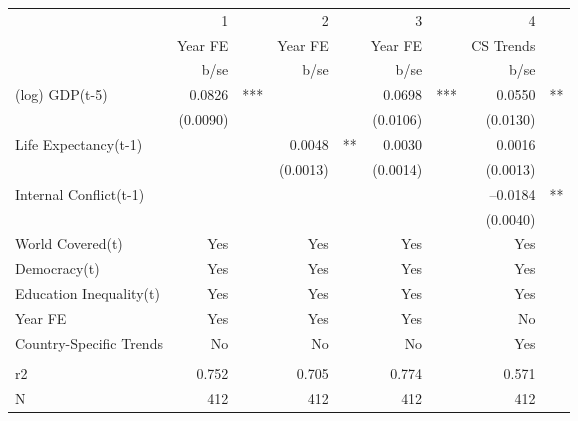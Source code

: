 \begin{tabular} {l* {4}{r @{} l}}
\hline
            &           1&   &           2&   &           3&   &           4&   \\
            &     Year FE&   &     Year FE&   &     Year FE&   &   CS Trends&   \\
            &        b/se&   &        b/se&   &        b/se&   &        b/se&   \\
\hline
(log) GDP(t-5) &      0.0826&***&            &   &      0.0698&***&      0.0550&** \\
            &    (0.0090)&   &            &   &    (0.0106)&   &    (0.0130)&   \\
Life Expectancy(t-1) &            &   &      0.0048&** &      0.0030&   &      0.0016&   \\
            &            &   &    (0.0013)&   &    (0.0014)&   &    (0.0013)&   \\
Internal Conflict(t-1)&            &   &            &   &            &   &    --0.0184&** \\
            &            &   &            &   &            &   &    (0.0040)&   \\
World Covered(t)  &         Yes&   &         Yes&   &         Yes&   &         Yes&   \\
Democracy(t)&         Yes&   &         Yes&   &         Yes&   &         Yes&   \\
Education Inequality(t) &         Yes&   &         Yes&   &         Yes&   &         Yes&   \\
Year FE     &         Yes&   &         Yes&   &         Yes&   &          No&   \\
Country-Specific Trends &          No&   &          No&   &          No&   &         Yes&   \\
 \\
r2          &       0.752&   &       0.705&   &       0.774&   &       0.571&   \\
N           &         412&   &         412&   &         412&   &         412&   \\
\hline
\end{tabular}
